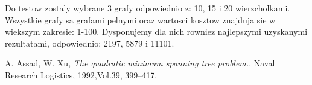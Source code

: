 \documentclass[12pt]{article}
\newcounter{lastnote}
\begin{document}
Do testow zostaly wybrane 3 grafy odpowiednio z: 10, 15 i 20 wierzcholkami. Wszystkie grafy sa grafami pelnymi oraz wartosci kosztow znajduja sie w wiekszym zakresie: 1-100. Dysponujemy dla nich rowniez najlepszymi uzyskanymi rezultatami, odpowiednio: 2197, 5879 i 11101.


\begin{thebibliography}{9}

  A. Assad, W. Xu,
  \emph{The quadratic minimum spanning tree problem.}.
  Naval Research Logistics, 1992,Vol.39, 399–417.

\end{thebibliography}














\clearpage
\end{document}
